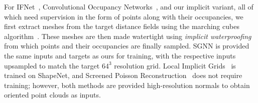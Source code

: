 For IFNet~\cite{chibane2020implicit}, Convolutional Occupancy Networks~\cite{mescheder2019occupancy}, and our implicit variant, all of which need supervision in the form of points along with their occupancies, we first extract meshes from the target distance fields using the marching cubes algorithm~\cite{lorensen1987marching}.
%
These meshes are then made watertight using \textit{implicit waterproofing}~\cite{chibane2020implicit} from which points and their occupancies are finally sampled.
%
SGNN is provided the same inputs and targets as ours for training, with the respective inputs upsampled to match the target $64^3$ resolution grid.
%
Local Implicit Grids~\cite{jiang2020local} is trained on ShapeNet, and Screened Poisson Reconstruction~\cite{kazhdan2013screened} does not require training; however, both methods are provided high-resolution normals to obtain oriented point clouds as inputs.



